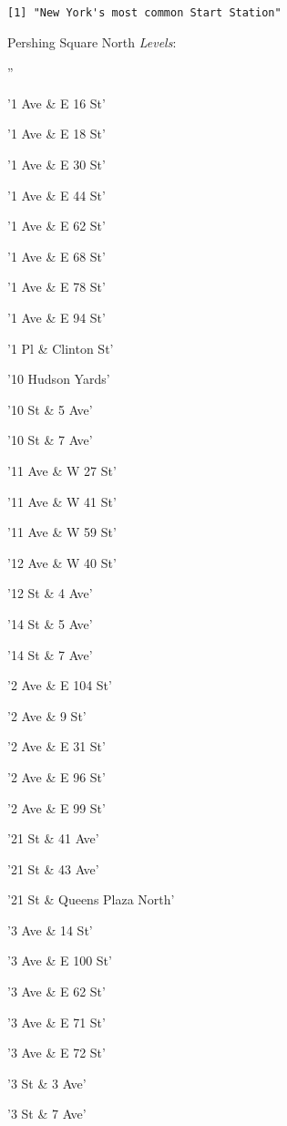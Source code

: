 \documentclass[11pt]{article}
\begin{document}
    \begin{Verbatim}[commandchars=\\\{\}]
[1] "New York's most common Start Station"

    \end{Verbatim}

    Pershing Square North
\emph{Levels}: \begin{enumerate*}
\item ''
\item '1 Ave \& E 16 St'
\item '1 Ave \& E 18 St'
\item '1 Ave \& E 30 St'
\item '1 Ave \& E 44 St'
\item '1 Ave \& E 62 St'
\item '1 Ave \& E 68 St'
\item '1 Ave \& E 78 St'
\item '1 Ave \& E 94 St'
\item '1 Pl \& Clinton St'
\item '10 Hudson Yards'
\item '10 St \& 5 Ave'
\item '10 St \& 7 Ave'
\item '11 Ave \& W 27 St'
\item '11 Ave \& W 41 St'
\item '11 Ave \& W 59 St'
\item '12 Ave \& W 40 St'
\item '12 St \& 4 Ave'
\item '14 St \& 5 Ave'
\item '14 St \& 7 Ave'
\item '2 Ave  \& E 104 St'
\item '2 Ave \& 9 St'
\item '2 Ave \& E 31 St'
\item '2 Ave \& E 96 St'
\item '2 Ave \& E 99 St'
\item '21 St \& 41 Ave'
\item '21 St \& 43 Ave'
\item '21 St \& Queens Plaza North'
\item '3 Ave \& 14 St'
\item '3 Ave \& E 100 St'
\item '3 Ave \& E 62 St'
\item '3 Ave \& E 71 St'
\item '3 Ave \& E 72 St'
\item '3 St \& 3 Ave'
\item '3 St \& 7 Ave'

\end{enumerate*}
\end{document}
